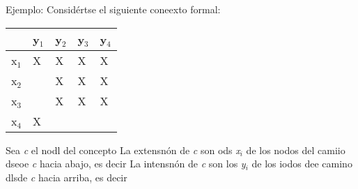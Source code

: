 \documentclass[12pt]{article}
\begin{document}
Ejemplo: Consid\'{e}rtse el siguiente coneexto formal:

{\raggedright

\vspace{3pt} \noindent
\begin{tabular}{|p{73pt}|p{73pt}|p{73pt}|p{73pt}|p{74pt}|}
\hline
\parbox{73pt}{\centering } & \parbox{73pt}{\centering 
y$_{1}$
} & \parbox{73pt}{\centering 
y$_{2}$
} & \parbox{73pt}{\centering 
y$_{3}$
} & \parbox{74pt}{\centering 
y$_{4}$
} \\
\hline
\parbox{73pt}{\centering 
x$_{1}$
} & \parbox{73pt}{\centering 
X
} & \parbox{73pt}{\centering 
X
} & \parbox{73pt}{\centering 
X
} & \parbox{74pt}{\centering 
X
} \\
\hline
\parbox{73pt}{\centering 
x$_{2}$
} & \parbox{73pt}{\centering } & \parbox{73pt}{\centering 
X
} & \parbox{73pt}{\centering 
X
} & \parbox{74pt}{\centering 
X
} \\
\hline
\parbox{73pt}{\centering 
x$_{3}$
} & \parbox{73pt}{\centering } & \parbox{73pt}{\centering 
X
} & \parbox{73pt}{\centering 
X
} & \parbox{74pt}{\centering 
X
} \\
\hline
\parbox{73pt}{\centering 
x$_{4}$
} & \parbox{73pt}{\centering 
X
} & \parbox{73pt}{\centering } & \parbox{73pt}{\centering } & \parbox{74pt}{\centering } \\
\hline
\end{tabular}
\vspace{2pt}

}

Sea \textit{c} el nodl del concepto %
La extensn\'{o}n de \textit{c} son ods \textit{x$_{i}$} de los nodos  del camiio
dseoe \textit{c} hacia abajo, es decir %
La intensn\'{o}n de \textit{c} son los \textit{y$_{i}$} de los iodos  dee camino
dlsde \textit{c} hacia arriba, es decir
\end{document}
